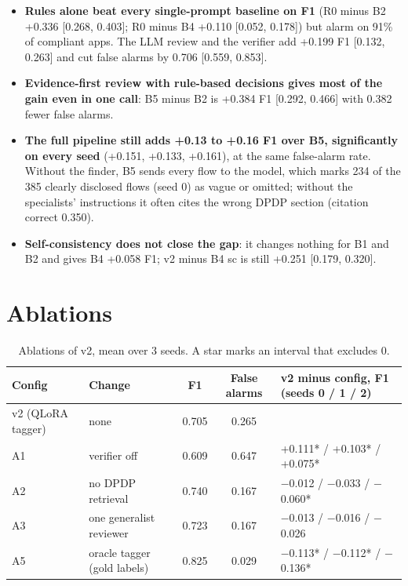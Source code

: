 \documentclass[11pt,a4paper]{article}
\begin{document}
\begin{itemize}
  \item \textbf{Rules alone beat every single-prompt baseline on F1} (R0 minus B2 +0.336
        [0.268, 0.403]; R0 minus B4 +0.110 [0.052, 0.178]) but alarm on 91\% of compliant apps. The
        LLM review and the verifier add +0.199 F1 [0.132, 0.263] and cut false alarms by 0.706
        [0.559, 0.853].
  \item \textbf{Evidence-first review with rule-based decisions gives most of the gain even in one
        call}: B5 minus B2 is +0.384 F1 [0.292, 0.466] with 0.382 fewer false alarms.
  \item \textbf{The full pipeline still adds +0.13 to +0.16 F1 over B5, significantly on every seed}
        (+0.151, +0.133, +0.161), at the same false-alarm rate. Without the finder, B5 sends every
        flow to the model, which marks 234 of the 385 clearly disclosed flows (seed 0) as vague or
        omitted; without the specialists' instructions it often cites the wrong DPDP section
        (citation correct 0.350).
  \item \textbf{Self-consistency does not close the gap}: it changes nothing for B1 and B2 and gives
        B4 +0.058 F1; v2 minus B4 sc is still +0.251 [0.179, 0.320].
\end{itemize}

\section{Ablations}

\begin{table}[H]
\centering
\small
\begin{tabular}{llccl}
\toprule
Config & Change & F1 & False alarms & v2 minus config, F1 (seeds 0 / 1 / 2) \\
\midrule
v2 (QLoRA tagger) & none & 0.705 & 0.265 & \\
A1 & verifier off & 0.609 & 0.647 & +0.111* / +0.103* / +0.075* \\
A2 & no DPDP retrieval & 0.740 & 0.167 & $-$0.012 / $-$0.033 / $-$0.060* \\
A3 & one generalist reviewer & 0.723 & 0.167 & $-$0.013 / $-$0.016 / $-$0.026 \\
A5 & oracle tagger (gold labels) & 0.825 & 0.029 & $-$0.113* / $-$0.112* / $-$0.136* \\
\bottomrule
\end{tabular}
\caption{Ablations of v2, mean over 3 seeds. A star marks an interval that excludes 0.}
\end{table}
\end{document}

